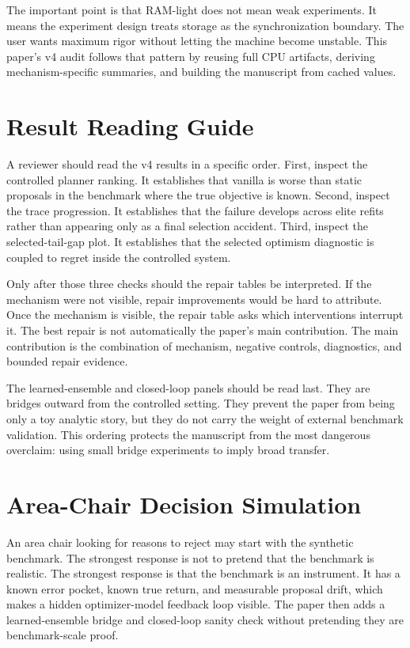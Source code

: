 The important point is that RAM-light does not mean weak experiments. It means
the experiment design treats storage as the synchronization boundary. The user
wants maximum rigor without letting the machine become unstable. This paper's
v4 audit follows that pattern by reusing full CPU artifacts, deriving
mechanism-specific summaries, and building the manuscript from cached values.

\section{Result Reading Guide}
\label{app:reading-guide}

A reviewer should read the v4 results in a specific order. First, inspect the
controlled planner ranking. It establishes that vanilla \cem{} is worse than
static proposals in the benchmark where the true objective is known. Second,
inspect the trace progression. It establishes that the failure develops across
elite refits rather than appearing only as a final selection accident. Third,
inspect the selected-tail-gap plot. It establishes that the selected optimism
diagnostic is coupled to regret inside the controlled system.

Only after those three checks should the repair tables be interpreted. If the
mechanism were not visible, repair improvements would be hard to attribute.
Once the mechanism is visible, the repair table asks which interventions
interrupt it. The best repair is not automatically the paper's main
contribution. The main contribution is the combination of mechanism, negative
controls, diagnostics, and bounded repair evidence.

The learned-ensemble and closed-loop panels should be read last. They are
bridges outward from the controlled setting. They prevent the paper from being
only a toy analytic story, but they do not carry the weight of external
benchmark validation. This ordering protects the manuscript from the most
dangerous overclaim: using small bridge experiments to imply broad transfer.

\section{Area-Chair Decision Simulation}
\label{app:ac-simulation}

An area chair looking for reasons to reject may start with the synthetic
benchmark. The strongest response is not to pretend that the benchmark is
realistic. The strongest response is that the benchmark is an instrument. It
has a known error pocket, known true return, and measurable proposal drift,
which makes a hidden optimizer-model feedback loop visible. The paper then
adds a learned-ensemble bridge and closed-loop sanity check without pretending
they are benchmark-scale proof.


